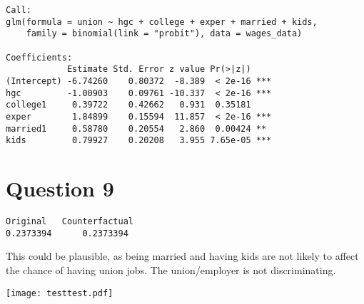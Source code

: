 \documentclass{article}
\begin{document}
\begin{verbatim}
Call:
glm(formula = union ~ hgc + college + exper + married + kids, 
    family = binomial(link = "probit"), data = wages_data)

Coefficients:
            Estimate Std. Error z value Pr(>|z|)    
(Intercept) -6.74260    0.80372  -8.389  < 2e-16 ***
hgc         -1.00903    0.09761 -10.337  < 2e-16 ***
college1     0.39722    0.42662   0.931  0.35181    
exper        1.84899    0.15594  11.857  < 2e-16 ***
married1     0.58780    0.20554   2.860  0.00424 ** 
kids         0.79927    0.20208   3.955 7.65e-05 ***
\end{verbatim}

\section*{Question 9}

\begin{verbatim}
Original   Counterfactual
0.2373394      0.2373394
\end{verbatim}

This could be plausible, as being married and having kids are not likely to affect the chance of having union jobs. The union/employer is not discriminating.

\texttt{[image: testtest.pdf]}
\end{document}
